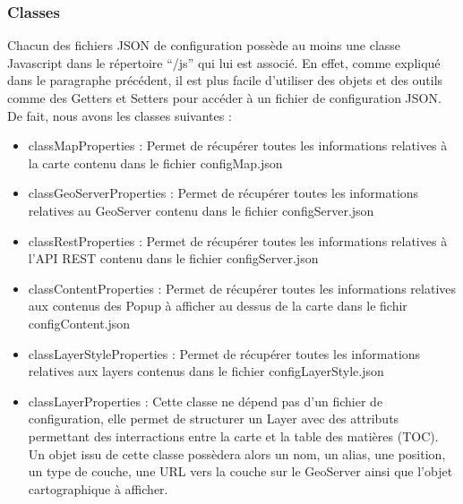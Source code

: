 
\subsubsection{Classes}


Chacun des fichiers JSON de configuration possède au moins une classe Javascript dans le répertoire ``/js'' qui lui est associé. En effet, comme expliqué dans le paragraphe précédent, il est plus facile d'utiliser des objets et des outils comme des Getters et Setters pour accéder à un fichier de configuration JSON. De fait, nous avons les classes suivantes : 

\begin{itemize}
  \item classMapProperties : Permet de récupérer toutes les informations relatives à la carte contenu dans le fichier configMap.json
  \item classGeoServerProperties : Permet de récupérer toutes les informations relatives au GeoServer contenu dans le fichier configServer.json
  \item classRestProperties : Permet de récupérer toutes les informations relatives à l'API REST contenu dans le fichier configServer.json
  \item classContentProperties : Permet de récupérer toutes les informations relatives aux contenus des Popup à afficher au dessus de la carte dans le fichir configContent.json
  \item classLayerStyleProperties : Permet de récupérer toutes les informations relatives aux layers contenus dans le fichier configLayerStyle.json
  \item classLayerProperties : Cette classe ne dépend pas d'un fichier de configuration, elle permet de structurer un Layer avec des attributs permettant des interractions entre la carte et la table des matières (TOC). Un objet issu de cette classe possèdera alors un nom, un alias, une position, un type de couche, une URL vers la couche sur le GeoServer ainsi que l'objet cartographique à afficher.
\end{itemize}



